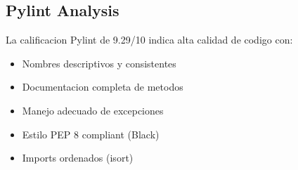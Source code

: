 \documentclass[12pt,a4paper]{report}
\begin{document}
\begin{appendices}
\section{Pylint Analysis}

La calificacion Pylint de 9.29/10 indica alta calidad de codigo con:

\begin{itemize}
    \item Nombres descriptivos y consistentes
    \item Documentacion completa de metodos
    \item Manejo adecuado de excepciones
    \item Estilo PEP 8 compliant (Black)
    \item Imports ordenados (isort)
\end{itemize}

\end{appendices}
\end{document}
